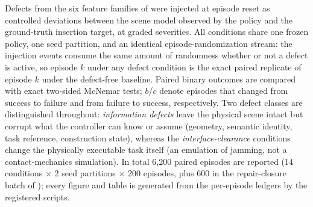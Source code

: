 Defects from the six feature families of  were injected
at episode reset as controlled deviations between the scene model observed by
the policy and the ground-truth insertion target, at graded severities. All
conditions share one frozen policy, one seed partition, and an identical
episode-randomization stream: the injection events consume the same amount of
randomness whether or not a defect is active, so episode $k$ under any defect
condition is the exact paired replicate of episode $k$ under the defect-free
baseline. Paired binary outcomes are compared with exact two-sided McNemar
tests; $b$/$c$ denote episodes that changed from success to failure and from
failure to success, respectively. Two defect classes are distinguished
throughout: \emph{information defects} leave the physical scene intact but
corrupt what the controller can know or assume (geometry, semantic identity,
task reference, construction state), whereas the \emph{interface-clearance}
conditions change the physically executable task itself (an emulation of
jamming, not a contact-mechanics simulation). In total 6{,}200 paired
episodes are reported (14 conditions $\times$ 2 seed partitions $\times$ 200
episodes, plus 600 in the repair-closure batch of );
every figure and table
is generated from the per-episode ledgers by the registered scripts.

